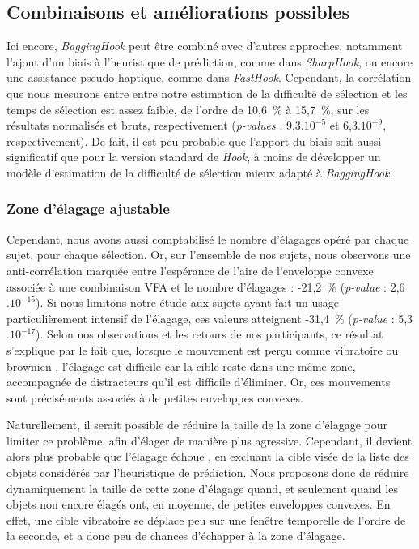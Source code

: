 	\subsection{Combinaisons et améliorations possibles}
	Ici encore, \emph{BaggingHook} peut être combiné avec d'autres approches, notamment l'ajout d'un biais à l'heuristique de prédiction, comme dans \emph{SharpHook}, ou encore une assistance pseudo-haptique, comme dans \emph{FastHook}. Cependant, la corrélation que nous mesurons entre entre notre estimation de la difficulté de sélection et les temps de sélection est assez faible, de l'ordre de 10,6~\%{} à 15,7~\%{}, sur les résultats normalisés et bruts, respectivement (\emph{p-values} : 9,3$.10^{-5}$ et 6,3$.10^{-9}$, respectivement). De fait, il est peu probable que l'apport du biais soit aussi significatif que pour la version standard de \emph{Hook}, à moins de développer un modèle d'estimation de la difficulté de sélection mieux adapté à \emph{BaggingHook}.
	
	\subsubsection{Zone d'élagage ajustable}
	Cependant, nous avons aussi comptabilisé le nombre d'élagages opéré par chaque sujet, pour chaque sélection. Or, sur l'ensemble de nos sujets, nous observons une anti-corrélation marquée entre l'espérance de l'aire de l'enveloppe convexe associée à une combinaison VFA et le nombre d'élagages : -21,2~\%{} (\emph{p-value} : 2,6$.10^{-15}$). Si nous limitons notre étude aux sujets ayant fait un usage particulièrement intensif de l'élagage, ces valeurs atteignent -31,4~\%{} (\emph{p-value} : 5,3$.10^{-17}$). Selon nos observations et les retours de nos participants, ce résultat s'explique par le fait que, lorsque le mouvement est perçu comme \og vibratoire \fg{} ou \og brownien \fg{}, l'élagage est difficile car la cible reste dans une même zone, accompagnée de distracteurs qu'il est difficile d'éliminer. Or, ces mouvements sont préciséments associés à de petites enveloppes convexes.
	
	Naturellement, il serait possible de réduire la taille de la zone d'élagage pour limiter ce problème, afin d'élager de manière plus agressive. Cependant, il devient alors plus probable que l'élagage \og échoue \fg{}, en excluant la cible visée de la liste des objets considérés par l'heuristique de prédiction. Nous proposons donc de réduire dynamiquement la taille de cette zone d'élagage quand, et seulement quand les objets non encore élagés ont, en moyenne, de petites enveloppes convexes. En effet, une cible vibratoire se déplace peu sur une fenêtre temporelle de l'ordre de la seconde, et a donc peu de chances d'échapper à la zone d'élagage.
	
